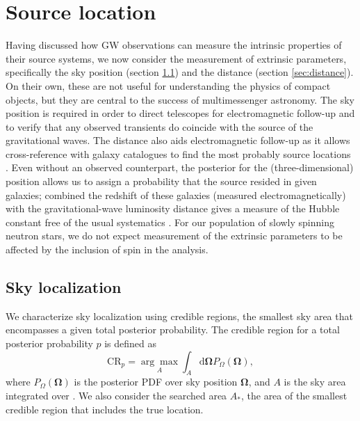\section{Source location}\label{sec:extrinsic}

Having discussed how GW observations can measure the intrinsic properties of their source systems, we now consider the measurement of extrinsic parameters, specifically the sky position (section \ref{sec:sky}) and the distance (section \ref{sec:distance}). On their own, these are not useful for understanding the physics of compact objects, but they are central to the success of multimessenger astronomy. The sky position is required in order to direct telescopes for electromagnetic follow-up and to verify that any observed transients do coincide with the source of the gravitational waves. The distance also aids electromagnetic follow-up as it allows cross-reference with galaxy catalogues to find the most probably source locations \citep{Nissanke_2012,Fan_2014}. Even without an observed counterpart, the posterior for the (three-dimensional) position allows us to assign a probability that the source resided in given galaxies; combined the redshift of these galaxies (measured electromagnetically) with the gravitational-wave luminosity distance gives a measure of the Hubble constant free of the usual systematics \citep{Schutz_1986,Del_Pozzo_2012}. For our population of slowly spinning neutron stars, we do not expect measurement of the extrinsic parameters to be affected by the inclusion of spin in the analysis.

\subsection{Sky localization}\label{sec:sky}

We characterize sky localization using credible regions, the smallest sky area that encompasses a given total posterior probability. The credible region for a total posterior probability $p$ is defined as
\begin{equation}
\mathrm{CR}_p = \underset{A}{\arg\!\max} \int_A \mathrm{d}\boldsymbol{\Omega} P_{\Omega}(\boldsymbol{\Omega}),
\label{eq:CR}
\end{equation}
where $P_{\Omega}(\boldsymbol{\Omega})$ is the posterior PDF over sky position $\boldsymbol{\Omega}$, and $A$ is the sky area integrated over \citep{Sidery_2014}. We also consider the searched area $A_\ast$, the area of the smallest credible region that includes the true location.

